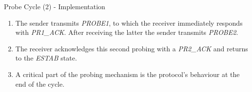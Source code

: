 \begin{frame}{Probe Cycle (2) - Implementation}
   \begin{enumerate}
	\item  The sender transmits \textit{PROBE1}, to which the receiver
    	       immediately responds with \textit{PR1_ACK}. After receiving
	       the latter the sender transmits \textit{PROBE2}.
  	\item  The receiver acknowledges this second probing
	       with a \textit{PR2_ACK} and returns to the \textit{ESTAB} state.
  	\item  A critical part of the probing mechanism is the
    	       protocol's behaviour at the end of the cycle.
   \end{enumerate}
\end{frame}

